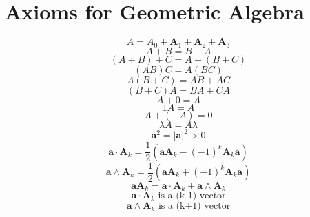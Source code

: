\documentclass[11pt, a4paper, fleqn]{report}
\numberwithin{equation}{section}
\begin{document}
\section{Axioms for Geometric Algebra}
\begin{equation}
    A = A_0+\mathbf{A}_1+\mathbf{A}_2+\mathbf{A}_3
\end{equation}
\begin{equation}
    A+B=B+A
\end{equation}
\begin{equation}
    (A+B)+C=A+(B+C)
\end{equation}
\begin{equation}
    (AB)C=A(BC)
\end{equation}
\begin{equation}
    A(B+C)=AB+AC
\end{equation}
\begin{equation}
    (B+C)A=BA+CA
\end{equation}
\begin{equation}
    A+0=A
\end{equation}
\begin{equation}
    1A=A
\end{equation}
\begin{equation}
    A+(-A)=0
\end{equation}
\begin{equation}
    \lambda A=A\lambda
\end{equation}
\begin{equation}
    \mathbf{a}^2=|\mathbf{a}|^2>0
\end{equation}
\begin{equation}\tag{1.7.12a}
    \mathbf{a}\cdot\mathbf{A}_k=\frac{1}{2}(\mathbf{a}\mathbf{A}_k-(-1)^k\mathbf{A}_k\mathbf{a})
\end{equation}
\begin{equation}\tag{1.7.12b}
    \mathbf{a}\wedge\mathbf{A}_k=\frac{1}{2}(\mathbf{a}\mathbf{A}_k+(-1)^k\mathbf{A}_k\mathbf{a})
\end{equation}
\begin{equation}\tag{1.7.12c}
    \mathbf{a}\mathbf{A}_k=\mathbf{a}\cdot\mathbf{A}_k+\mathbf{a}\wedge\mathbf{A}_k
\end{equation}
\begin{equation}\tag{1.7.13a}
    \mathbf{a}\cdot\mathbf{A}_k\textrm{ is a (k-1) vector}
\end{equation}
\begin{equation}\tag{1.7.13b}
    \mathbf{a}\wedge\mathbf{A}_k\textrm{ is a (k+1) vector}
\end{equation}
\end{document}
